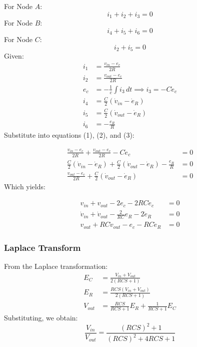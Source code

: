 \documentclass[11pt]{article}
\begin{document}
For Node \(A\):
\begin{equation}
    i_1 + i_2 + i_3 = 0 \tag{1}
\end{equation}
For Node \(B\):
\begin{equation}
    i_4 + i_5 + i_6 = 0 \tag{2}
\end{equation}
For Node \(C\):
\begin{equation}
    i_2 + i_5 = 0 \tag{3}
\end{equation}
Given:
\begin{align*}
    i_1 &= \frac{v_{in} - e_c}{2R} \\
    i_2 &= \frac{v_{out} - e_c}{2R} \\
    e_c &= -\frac{1}{c} \int i_3 \, dt \implies i_3 = -C\dot{e}_c \\
    i_4 &= \frac{C}{2}(\dot{v}_{in} - \dot{e}_R) \\
    i_5 &= \frac{C}{2}(\dot{v}_{out} - \dot{e}_R) \\
    i_6 &= -\frac{e_R}{R}
\end{align*}
Substitute into equations (1), (2), and (3):

\begin{align*}
    \frac{v_{in} - e_c}{2R} + \frac{v_{out} - e_c}{2R} - C\dot{e}_c &= 0 \\
    \frac{C}{2}(\dot{v}_{in} - \dot{e}_R) + \frac{C}{2}(\dot{v}_{out} - \dot{e}_R) - \frac{e_R}{R} &= 0 \\
    \frac{v_{out} - e_c}{2R} + \frac{C}{2}(\dot{v}_{out} - \dot{e}_R) &= 0
\end{align*}
Which yields:

\begin{align*}
    v_{in} + v_{out} - 2e_c - 2RC\dot{e}_c &= 0 \\
    \dot{v}_{in} + \dot{v}_{out} - \frac{2}{RC} e_R - 2\dot{e}_R &= 0 \\
    v_{out} + RC\dot{v}_{out} - e_c - RC\dot{e}_R &= 0
\end{align*}

\subsubsection*{Laplace Transform}

From the Laplace transformation:
\begin{align}
    E_C &= \frac{V_{in} + V_{out}}{2(RCS + 1)} \tag{4} \\
    E_R &= \frac{RCS(V_{in} + V_{out})}{2(RCS + 1)} \tag{5} \\
    V_{out} &= \frac{RCS}{RCS + 1}E_R + \frac{1}{RCS + 1}E_C \tag{6}
\end{align}
Substituting, we obtain:
\[ \frac{V_{in}}{V_{out}} = \frac{(RCS)^2 + 1}{(RCS)^2 + 4RCS + 1} \]
\end{document}
